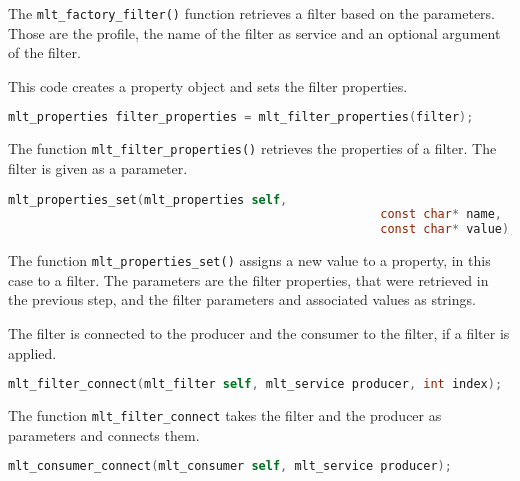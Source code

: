 \documentclass[../MasterThesis.tex]{subfiles}
\begin{document}
\begin{description}[font=\color{RedViolet!80!black}, style=nextline]
	The \texttt{mlt\_factory\_filter()} function retrieves a filter based on the parameters. Those are the profile, the name of the filter as service and an optional argument of the filter.



	\item[Create and set filter properties] 

	This code creates a property object and sets the filter properties.

	\begin{lstlisting}[language=C, numbers=none, columns=fullflexible, belowskip=0pt, aboveskip=9pt]
	mlt_properties filter_properties = mlt_filter_properties(filter); \end{lstlisting}

	The function \texttt{mlt\_filter\_properties()} retrieves the properties of a filter. The filter is given as a parameter.

	\begin{lstlisting}[language=C, numbers=none, columns=fullflexible, belowskip=0pt, aboveskip=9pt]
	mlt_properties_set(mlt_properties self, 
													const char* name, 
													const char* value); \end{lstlisting}

	The function \texttt{mlt\_properties\_set()} assigns a new value to a property, in this case to a filter. The parameters are the filter properties, that were retrieved in the previous step, and the filter parameters and associated values as strings.
	
	
	
	
	\item[Connect elements] 
	
	The filter is connected to the producer and the consumer to the filter, if a filter is applied.
	
	\begin{lstlisting}[language=C, numbers=none, columns=fullflexible, belowskip=0pt, aboveskip=9pt]
	mlt_filter_connect(mlt_filter self, mlt_service producer, int index); \end{lstlisting}

	The function \texttt{mlt\_filter\_connect} takes the filter and the producer as parameters and connects them.
	
	\begin{lstlisting}[language=C, numbers=none, columns=fullflexible, belowskip=0pt, aboveskip=9pt]
	mlt_consumer_connect(mlt_consumer self, mlt_service producer); \end{lstlisting}


\end{description}
\end{document}
